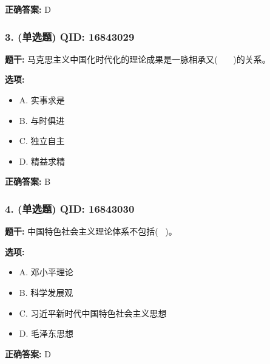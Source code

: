 \documentclass[12pt,UTF8]{ctexart}
\begin{document}
\textbf{正确答案:}
D

\vspace{0.3em}\hrulefill\vspace{0.7em}

\subsubsection*{3. (单选题) \small QID: 16843029}

\textbf{题干:}
马克思主义中国化时代化的理论成果是一脉相承又(    )的关系。

\textbf{选项:}
\begin{itemize}[leftmargin=*]

  \item A. 实事求是

  \item B. 与时俱进

  \item C. 独立自主

  \item D. 精益求精

\end{itemize}

\textbf{正确答案:}
B

\vspace{0.3em}\hrulefill\vspace{0.7em}

\subsubsection*{4. (单选题) \small QID: 16843030}

\textbf{题干:}
中国特色社会主义理论体系不包括(  )。

\textbf{选项:}
\begin{itemize}[leftmargin=*]

  \item A. 邓小平理论

  \item B. 科学发展观

  \item C. 习近平新时代中国特色社会主义思想

  \item D. 毛泽东思想

\end{itemize}

\textbf{正确答案:}
D

\vspace{0.3em}\hrulefill\vspace{0.7em}
\end{document}

